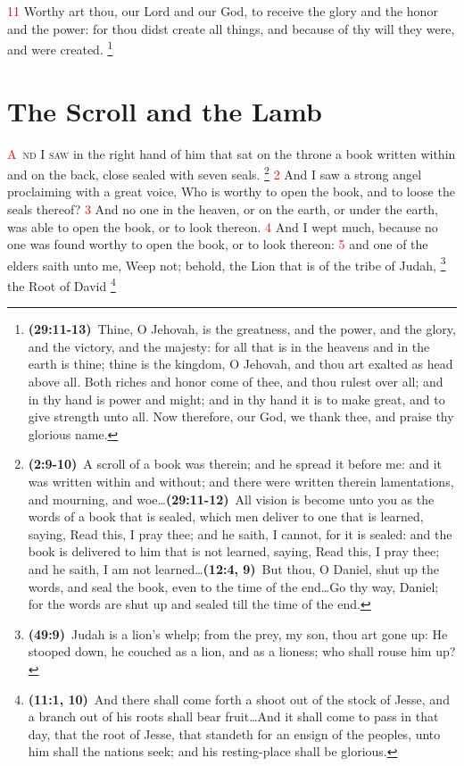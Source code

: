\documentclass[12pt,twoside]{memoir}
\newcommand{\cbibleref}[3]{\textbf{\ibibleverse[textit]{#1}(#2)}\ {#3}}
\newcommand{\cbiblefoot}[3]{\footnote{\cbibleref{#1}{#2}{#3}}}
\newcommand{\cbiblefoottrio}[9]{\footnote{\cbibleref{#1}{#2}{#3}\ldots \cbibleref{#4}{#5}{#6}\ldots \cbibleref{#7}{#8}{#9}}}
\newcommand{\vnum}[1]{\textcolor{red}{\normalsize{#1}}}
\begin{document}
\vnum{11} Worthy art thou, our Lord and our God, to receive the glory and the honor and the power: for thou didst create all things, and because of thy will they were, and were created.%
	\cbiblefoot{IChronicles}{29:11-13}{Thine, O Jehovah, is the greatness, and the power, and the glory, and the victory, and the majesty: for all that is in the heavens and in the earth is thine; thine is the kingdom, O Jehovah, and thou art exalted as head above all. Both riches and honor come of thee, and thou rulest over all; and in thy hand is power and might; and in thy hand it is to make great, and to give strength unto all. Now therefore, our God, we thank thee, and praise thy glorious name.}


\chapter{The Scroll and the Lamb}
\lettrine[lines=3,slope=0.5em]{\textcolor{red}{A}}{\ nd I saw} in the right hand of him that sat on the throne a book written within and on the back, close sealed with seven seals.%
 \cbiblefoottrio{Ezekiel}{2:9-10}{A scroll of a book was therein; and he spread it before me: and it was written within and without; and there were written therein lamentations, and mourning, and woe}%
 					{Isaiah}{29:11-12}{All vision is become unto you as the words of a book that is sealed, which men deliver to one that is learned, saying, Read this, I pray thee; and he saith, I cannot, for it is sealed: and the book is delivered to him that is not learned, saying, Read this, I pray thee; and he saith, I am not learned}%
 					{Daniel}{12:4, 9}{But thou, O Daniel, shut up the words, and seal the book, even to the time of the end\ldots Go thy way, Daniel; for the words are shut up and sealed till the time of the end.} %
\vnum{2} And I saw a strong angel proclaiming with a great voice, Who is worthy to open the book, and to loose the seals thereof? %
\vnum{3} And no one in the heaven, or on the earth, or under the earth, was able to open the book, or to look thereon. %
\vnum{4} And I wept much, because no one was found worthy to open the book, or to look thereon: %
\vnum{5} and one of the elders saith unto me, Weep not; behold, the Lion that is of the tribe of Judah,%
	\cbiblefoot{Genesis}{49:9}{Judah is a lion's whelp; from the prey, my son, thou art gone up: He stooped down, he couched as a lion, and as a lioness; who shall rouse him up?}
 the Root of David%
 	\cbiblefoot{Isaiah}{11:1, 10}{And there shall come forth a shoot out of the stock of Jesse, and a branch out of his roots shall bear fruit\ldots And it shall come to pass in that day, that the root of Jesse, that standeth for an ensign of the peoples, unto him shall the nations seek; and his resting-place shall be glorious.}
\end{document}
